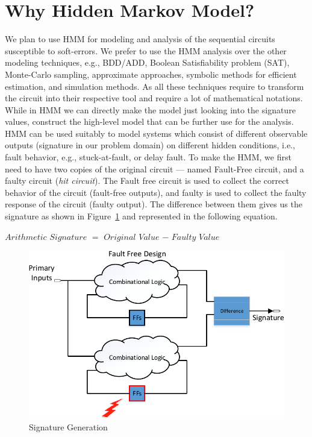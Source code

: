 \section{Why Hidden Markov Model?}
We plan to use HMM for modeling and analysis of the sequential circuits susceptible to soft-errors. We prefer to use the HMM analysis over the other modeling techniques, e.g., BDD/ADD, Boolean Satisfiability problem (SAT), Monte-Carlo sampling, approximate approaches, symbolic methods for efficient estimation, and simulation methods. As all these techniques require to transform the circuit into their respective tool and require a lot of mathematical notations. While in HMM we can directly make the model just looking into the signature values, construct the high-level model that can be further use for the analysis. HMM can be used suitably to model systems which consist of different observable outputs (signature in our problem domain) on different hidden conditions, i.e., fault behavior, e.g., stuck-at-fault, or delay fault.
To make the HMM, we first need to have two copies of the original circuit --- named Fault-Free circuit, and a faulty circuit (\textit{hit circuit}). The Fault free circuit is used to collect the correct behavior of the circuit (fault-free outputs), and faulty is used to collect the faulty response of the circuit (faulty output). The difference between them gives us the signature as shown in Figure~\ref{fig:SG} and represented in the following equation.
\begin{center}
$Arithmetic$ $Signature$ $=$ $Original$ $Value$ $-$ $Faulty$ $Value$
\end{center}
 \begin{figure}[tb!]
 \centering
  \captionsetup{justification=centering}    
   \includegraphics[scale=0.8]{Figures/signature1.pdf}
   \caption{Signature Generation}
\label{fig:SG}
\end{figure}

